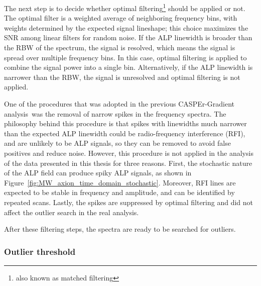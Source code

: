 
The next step is to decide whether optimal filtering\footnote{also known as matched filtering} should be applied or not.
The optimal filter is a weighted average of neighboring frequency bins, with weights determined by the expected signal lineshape; this choice maximizes the SNR among linear filters for random noise.
If the ALP linewidth is broader than the RBW of the spectrum, the signal is resolved, which means the signal is spread over multiple frequency bins.
In this case, optimal filtering is applied to combine the signal power into a single bin.
Alternatively, if the ALP linewidth is narrower than the RBW, the signal is unresolved and optimal filtering is not applied.

One of the procedures that was adopted in the previous CASPEr-Gradient analysis\,\cite{Walter2025_CASPErLFthermal} was the removal of narrow spikes in the frequency spectra.
The philosophy behind this procedure is that spikes with linewidths much narrower than the expected ALP linewidth could be radio-frequency interference (RFI), and are unlikely to be ALP signals, so they can be removed to avoid false positives and reduce noise.
However, this procedure is not applied in the analysis of the data presented in this thesis for three reasons. First, the stochastic nature of the ALP field can produce spiky ALP signals, as shown in Figure~\ref{fig:MW_axion_time_domain_stochastic}.
Moreover, RFI lines are expected to be stable in frequency and amplitude, and can be identified by repeated scans.
Lastly, the spikes are suppressed by optimal filtering and did not affect the outlier search in the real analysis.

After these filtering steps, the spectra are ready to be searched for outliers.

\subsubsection{Outlier threshold}\label{sec:results:data_analysis:procedure:outlier_threshold}

